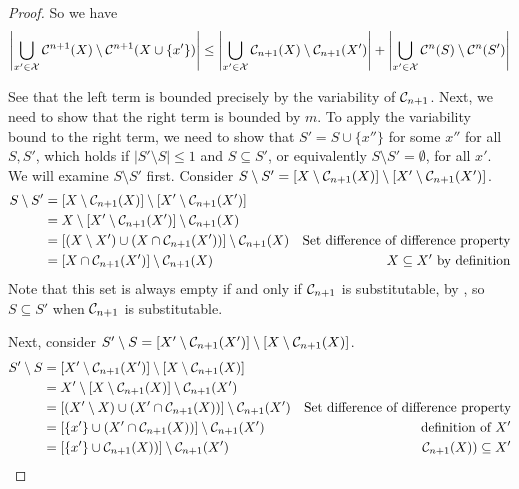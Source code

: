 \begin{proof}
So we have
\begin{equation*}
    \left|\bigcup\limits_{x'\in\mathcal{X}} \mathcal{C}^{n+1}(X) \setminus \mathcal{C}^{n+1}(X \cup \{x'\}) \right| \leq \left|\bigcup\limits_{x'\in\mathcal{X}}  \mathcal{C}_{n+1}(X) \setminus \mathcal{C}_{n+1}(X') \right| + \left| \bigcup\limits_{x'\in\mathcal{X}} \mathcal{C}^n(S)\setminus \mathcal{C}^n(S')\right|
\end{equation*}

See that the left term is bounded precisely by the variability of $\mathcal{C}_{n+1}$.
Next, we need to show that the right term is bounded by $m$.
To apply the variability bound to the right term, we need to show that $S' = S \cup \{x''\}$ for some $x''$ for all $S, S'$, which holds if $|S' \setminus S| \leq 1$ and $S \subseteq S'$, or equivalently $S \setminus S' = \emptyset$, for all $x'$.
We will examine $S \setminus S'$ first.
Consider $S \setminus S' = \left[X \setminus \mathcal{C}_{n+1}(X)\right] \setminus  \left[X' \setminus \mathcal{C}_{n+1}(X')\right] $.
\begin{align*}
    S \setminus S' & = \left[X \setminus \mathcal{C}_{n+1}(X)\right] \setminus  \left[X' \setminus \mathcal{C}_{n+1}(X')\right]\\
    & = X \setminus \left[X' \setminus \mathcal{C}_{n+1}(X')\right] \setminus   \mathcal{C}_{n+1}(X) \\
    & = \left[(X \setminus X') \cup (X \cap \mathcal{C}_{n+1}(X')) \right] \setminus  \mathcal{C}_{n+1}(X) & \text{Set difference of difference property}\\
    & = [X \cap \mathcal{C}_{n+1}(X')] \setminus  \mathcal{C}_{n+1}(X) & \text{$X \subseteq X'$ by definition}\\
\end{align*}
Note that this set is always empty if and only if $\mathcal{C}_{n+1}$ is substitutable, by , so $S \subseteq S'$ when $\mathcal{C}_{n+1}$ is substitutable.

Next, consider $S' \setminus S = \left[X' \setminus \mathcal{C}_{n+1}(X')\right] \setminus  \left[X \setminus \mathcal{C}_{n+1}(X)\right] $.
\begin{align*}
    S' \setminus S & = \left[X' \setminus \mathcal{C}_{n+1}(X')\right] \setminus  \left[X \setminus \mathcal{C}_{n+1}(X)\right] \\
    & = X' \setminus \left[X \setminus \mathcal{C}_{n+1}(X)\right] \setminus   \mathcal{C}_{n+1}(X') \\
    & = \left[(X' \setminus X) \cup (X' \cap \mathcal{C}_{n+1}(X)) \right] \setminus  \mathcal{C}_{n+1}(X') & \text{Set difference of difference property}\\
    & = \left[\{x'\} \cup (X' \cap \mathcal{C}_{n+1}(X)) \right] \setminus  \mathcal{C}_{n+1}(X') & \text{definition of $X'$}\\
    & = \left[\{x'\} \cup \mathcal{C}_{n+1}(X)) \right] \setminus  \mathcal{C}_{n+1}(X') & \text{$\mathcal{C}_{n+1}(X)) \subseteq X'$}\\
\end{align*}


\end{proof}
